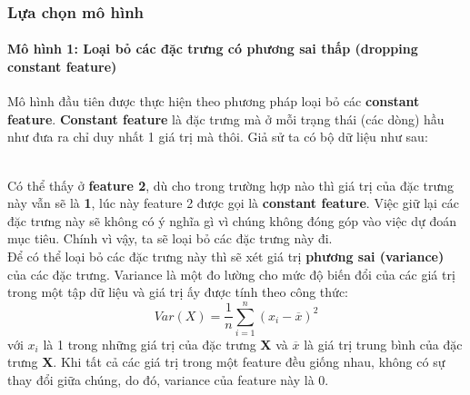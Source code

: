 \documentclass{report}
\begin{document}
    \subsubsection{Lựa chọn mô hình}
        \paragraph{Mô hình 1: Loại bỏ các đặc trưng có phương sai thấp (dropping constant feature)}\label{sec:dropping-constant-feature}
    Mô hình đầu tiên được thực hiện theo phương pháp loại bỏ các \textbf{constant feature}. \textbf{Constant feature} là đặc trưng mà ở mỗi trạng thái (các dòng) hầu như đưa ra chỉ duy nhất 1 giá trị mà thôi. Giả sử ta có bộ dữ liệu như sau:
\begin{table}[h]
    \centering
    \end{table}\\
    Có thể thấy ở \textbf{feature 2}, dù cho trong trường hợp nào thì giá trị của đặc trưng này vẫn sẽ là \textbf{1}, lúc này feature 2 được gọi là \textbf{constant feature}. Việc giữ lại các đặc trưng này sẽ không có ý nghĩa gì vì chúng không đóng góp vào việc dự đoán mục tiêu. Chính vì vậy, ta sẽ loại bỏ các đặc trưng này đi.\\

    Để có thể loại bỏ các đặc trưng này thì sẽ xét giá trị \textbf{phương sai (variance)} của các đặc trưng. Variance là một đo lường cho mức độ biến đổi của các giá trị trong một tập dữ liệu và giá trị ấy được tính theo công thức:
    \begin{equation}
        Var(X) = \frac{1}{n}\sum_{i=1}^{n}(x_i - \overline{x})^2
    \end{equation}
    với $x_i$ là 1 trong những giá trị của đặc trưng \textbf{X} và $\overline{x}$ là giá trị trung bình của đặc trưng \textbf{X}.
    Khi tất cả các giá trị trong một feature đều giống nhau, không có sự thay đổi giữa chúng, do đó, variance của feature này là 0.\\
\end{document}
